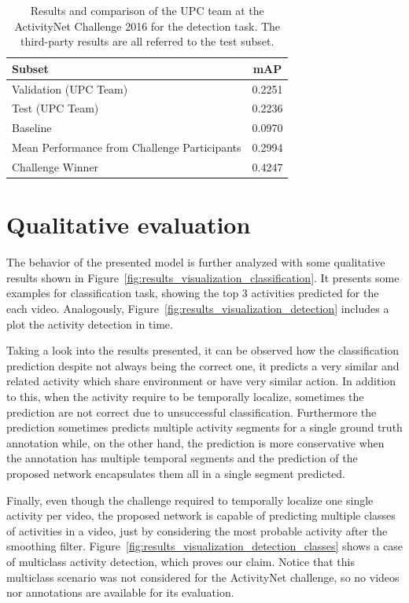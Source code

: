 \begin{table}[H]
\begin{center}
\begin{tabular}{|m{5cm}|c|}
\hline
\textbf{Subset} & \textbf{mAP} \\
\hline\hline
Validation (UPC Team) & 0.2251 \\
Test (UPC Team) & 0.2236 \\
\hline\hline
Baseline~\cite{caba2015activitynet} & 0.0970 \\
\hline
Mean Performance from Challenge Participants & 0.2994 \\
\hline
Challenge Winner & 0.4247 \\
\hline
\end{tabular}
\end{center}
\caption{Results and comparison of the UPC team at the ActivityNet Challenge 2016 for the detection task. The third-party results are all referred to the test subset.}
\label{table:detection_results_challenge}
\end{table}

\section{Qualitative evaluation}

The behavior of the presented model is further analyzed with some qualitative results shown in Figure~\ref{fig:results_visualization_classification}. It presents some examples for classification task, showing the top 3 activities predicted for the each video. Analogously, Figure~\ref{fig:results_visualization_detection} includes a plot the activity detection in time.

Taking a look into the results presented, it can be observed how the classification prediction despite not always being the correct one, it predicts a very similar and related activity which share environment or have very similar action. In addition to this, when the activity require to be temporally localize, sometimes the prediction are not correct due to unsuccessful classification. Furthermore the prediction sometimes predicts multiple activity segments for a single ground truth annotation while, on the other hand, the prediction is more conservative when the annotation has multiple temporal segments and the prediction of the proposed network encapsulates them all in a single segment predicted.

Finally, even though the challenge required to temporally localize one single activity per video, the proposed network is capable of predicting multiple classes of activities in a video, just by considering the most probable activity after the smoothing filter.
Figure~\ref{fig:results_visualization_detection_classes} shows a case of multiclass activity detection, which proves our claim.
Notice that this multiclass scenario was not considered for the ActivityNet challenge, so no videos nor annotations are available for its evaluation.

